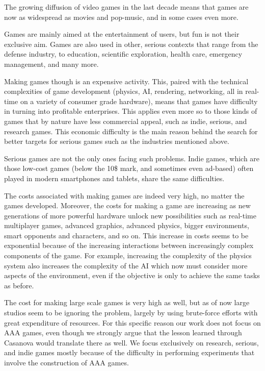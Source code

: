 The growing diffusion of video games in the last decade means that games are now as widespread as movies and pop-music, and in some cases even more.

Games are mainly aimed at the entertainment of users, but fun is not their exclusive aim. Games are also used in other, serious contexts that range from the defense industry, to education, scientific exploration, health care, emergency management, and many more. 

Making games though is an expensive activity. This, paired with the technical complexities of game development (physics, AI, rendering, networking, all in real-time on a variety of consumer grade hardware), means that games have difficulty in turning into profitable enterprises. This applies even more so to those kinds of games that by nature have less commercial appeal, such as indie, serious, and research games. This economic difficulty is the main reason behind the search for better targets for serious games such as the industries mentioned above.

Serious games are not the only ones facing such problems. Indie games, which are those low-cost games (below the 10\$ mark, and sometimes even ad-based) often played in modern smartphones and tablets, share the same difficulties.

The costs associated with making games are indeed very high, no matter the games developed. Moreover, the costs for making a game are increasing as new generations of more powerful hardware unlock new possibilities such as real-time multiplayer games, advanced graphics, advanced physics, bigger environments, smart opponents and characters, and so on. This increase in costs seems to be exponential because of the increasing interactions between increasingly complex components of the game. For example, increasing the complexity of the physics system also increases the complexity of the AI which now must consider more aspects of the environment, even if the objective is only to achieve the same tasks as before.

The cost for making large scale games is very high as well, but as of now large studios seem to be ignoring the problem, largely by using brute-force efforts with great expenditure of resources. For this specific reason our work does not focus on AAA games, even though we strongly argue that the lesson learned through Casanova would translate there as well. We focus exclusively on research, serious, and indie games mostly because of the difficulty in performing experiments that involve the construction of AAA games.

